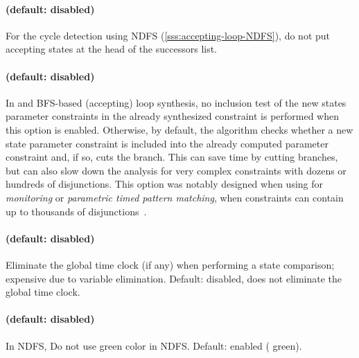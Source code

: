 \paragraph{ (default: disabled)}
For the cycle detection using NDFS (\cref{sss:accepting-loop-NDFS}),
do not put accepting states at the head of the successors list.


\paragraph{ (default: disabled)}
In \EFsynth{} and BFS-based (accepting) loop synthesis, no inclusion test of the new states parameter constraints in the already synthesized constraint is performed when this option is enabled.
Otherwise, by default, the algorithm checks whether a new state parameter constraint is included into the already computed parameter constraint and, if so, cuts the branch.
This can save time by cutting branches, but can also slow down the analysis for very complex constraints with dozens or hundreds of disjunctions.
This option was notably designed when using \imitator{} for \emph{monitoring} or \emph{parametric timed pattern matching}, when constraints can contain up to thousands of disjunctions~\cite{AHW18}.



\paragraph{ (default: disabled)}
Eliminate the global time clock (if any) when performing a state comparison; expensive due to variable elimination.
Default: disabled, \ie{} does not eliminate the global time clock.

\paragraph{ (default: disabled)}
In NDFS, Do not use green color in NDFS. Default: enabled (\ie{} green).

